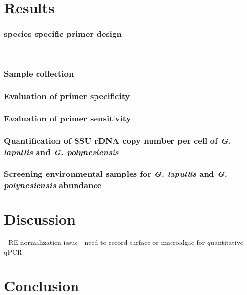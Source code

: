 \documentclass[12pt]{article}
\begin{document}
\section{Results}
\subsubsection{species specific primer design}
- 
\subsubsection{Sample collection}

\subsubsection{Evaluation of primer specificity}

\subsubsection{Evaluation of primer sensitivity}

\subsubsection{Quantification of SSU rDNA copy number per cell of \emph{G. lapullis} and \emph{G. polynesiensis}}

\subsubsection{Screening environmental samples for \emph{G. lapullis} and \emph{G. polynesiensis} abundance}

\section{Discussion}
- RE normalization issue
- need to record surface or macroalgae for quantitative qPCR
\section{Conclusion}

\FloatBarrier
\newpage


\end{document}
